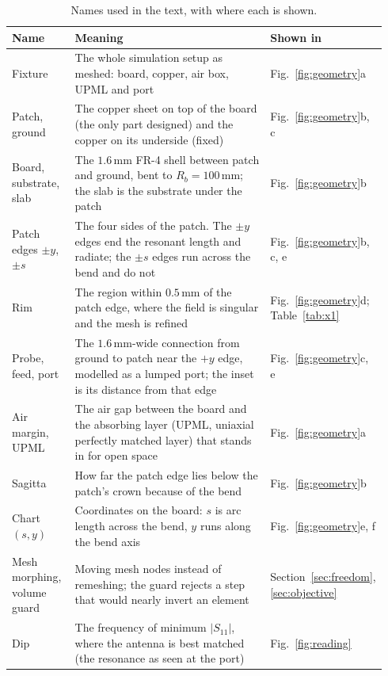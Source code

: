 \documentclass{anvil-paper}
\begin{document}
\begin{table}[t]
  \centering
  \caption{Names used in the text, with where each is shown.}
  \label{tab:terms}
  \footnotesize
  \begin{tabular}{@{}>{\raggedright\arraybackslash}p{0.17\linewidth}>{\raggedright\arraybackslash}p{0.62\linewidth}>{\raggedright\arraybackslash}p{0.15\linewidth}@{}}
    \toprule
    Name & Meaning & Shown in \\
    \midrule
    Fixture & The whole simulation setup as meshed: board, copper, air box, UPML and port & Fig.~\ref{fig:geometry}a \\
    Patch, ground & The copper sheet on top of the board (the only part designed) and the copper on its underside (fixed) & Fig.~\ref{fig:geometry}b, c \\
    Board, substrate, slab & The $1.6$\,mm FR-4 shell between patch and ground, bent to $R_b = 100$\,mm; the slab is the substrate under the patch & Fig.~\ref{fig:geometry}b \\
    Patch edges $\pm y$, $\pm s$ & The four sides of the patch. The $\pm y$ edges end the resonant length and radiate; the $\pm s$ edges run across the bend and do not & Fig.~\ref{fig:geometry}b, c, e \\
    Rim & The region within $0.5$\,mm of the patch edge, where the field is singular and the mesh is refined & Fig.~\ref{fig:geometry}d; Table~\ref{tab:x1} \\
    Probe, feed, port & The $1.6$\,mm-wide connection from ground to patch near the $+y$ edge, modelled as a lumped port; the inset is its distance from that edge & Fig.~\ref{fig:geometry}c, e \\
    Air margin, UPML & The air gap between the board and the absorbing layer (UPML, uniaxial perfectly matched layer) that stands in for open space & Fig.~\ref{fig:geometry}a \\
    Sagitta & How far the patch edge lies below the patch's crown because of the bend & Fig.~\ref{fig:geometry}b \\
    Chart $(s, y)$ & Coordinates on the board: $s$ is arc length across the bend, $y$ runs along the bend axis & Fig.~\ref{fig:geometry}e, f \\
    Mesh morphing, volume guard & Moving mesh nodes instead of remeshing; the guard rejects a step that would nearly invert an element & Section~\ref{sec:freedom}, \ref{sec:objective} \\
    Dip & The frequency of minimum $|S_{11}|$, where the antenna is best matched (the resonance as seen at the port) & Fig.~\ref{fig:reading} \\

\end{tabular}
\end{table}
\end{document}
